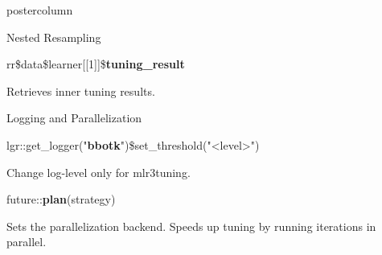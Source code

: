 \documentclass{beamer}
\begin{document}
\begin{frame}[fragile]{}
\begin{columns}
\begin{column}{.245\textwidth}
\begin{beamercolorbox}[center]{postercolumn}
\begin{minipage}{.98\textwidth}
{\begin{myblock}{Nested Resampling}
							\begin{codebox}
								rr\$data\$learner[[1]]\$\textbf{tuning\_result}
							\end{codebox}
							Retrieves inner tuning results.
							\vspace{-0.5em}
						\end{myblock}
						\begin{myblock}{Logging and Parallelization}
							\begin{codebox}
								{\scriptsize
									lgr::get\_logger("\textbf{bbotk}")\$set\_threshold("<level>")}
							\end{codebox}
							Change log-level only for mlr3tuning.\\
							\begin{codebox}
								future::\textbf{plan}(strategy)
							\end{codebox}
							Sets the parallelization backend.
							Speeds up tuning by running iterations in parallel.
						\end{myblock}
						\vfill}
				\end{minipage}
			\end{beamercolorbox}
		\end{column}
	\end{columns}
\end{frame}
\end{document}
